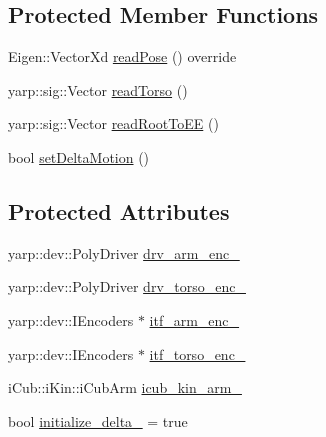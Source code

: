 \subsection*{Protected Member Functions}
\begin{DoxyCompactItemize}
\item 
Eigen\+::\+Vector\+Xd \hyperlink{classiCubFwdKinModel_ad549519048e9b54c18af51c6b173b726}{read\+Pose} () override
\item 
yarp\+::sig\+::\+Vector \hyperlink{classiCubFwdKinModel_a4ed6df084a996223a740a7065e16b799}{read\+Torso} ()
\item 
yarp\+::sig\+::\+Vector \hyperlink{classiCubFwdKinModel_a638ea7ef68d98f306346684c93934a93}{read\+Root\+To\+EE} ()
\item 
bool \hyperlink{classFwdKinModel_a12b54bd62ba5cf218973c600c66ba39e}{set\+Delta\+Motion} ()
\end{DoxyCompactItemize}
\subsection*{Protected Attributes}
\begin{DoxyCompactItemize}
\item 
yarp\+::dev\+::\+Poly\+Driver \hyperlink{classiCubFwdKinModel_a3a07f11e9b770e8fc7c03bff05c52927}{drv\+\_\+arm\+\_\+enc\+\_\+}
\item 
yarp\+::dev\+::\+Poly\+Driver \hyperlink{classiCubFwdKinModel_af0ca571291c508a2a058c1ff802e6421}{drv\+\_\+torso\+\_\+enc\+\_\+}
\item 
yarp\+::dev\+::\+I\+Encoders $\ast$ \hyperlink{classiCubFwdKinModel_a4478fa4b4f0689d819a19a5cccd69ae2}{itf\+\_\+arm\+\_\+enc\+\_\+}
\item 
yarp\+::dev\+::\+I\+Encoders $\ast$ \hyperlink{classiCubFwdKinModel_a2d83dd73bf08f66563e9e33d2c26d16a}{itf\+\_\+torso\+\_\+enc\+\_\+}
\item 
i\+Cub\+::i\+Kin\+::i\+Cub\+Arm \hyperlink{classiCubFwdKinModel_a4b92808d2c83eaff8a3bf18dede7001a}{icub\+\_\+kin\+\_\+arm\+\_\+}
\item 
bool \hyperlink{classFwdKinModel_a2ed7b77ebd710e5debe63b83a34a1645}{initialize\+\_\+delta\+\_\+} = true
\end{DoxyCompactItemize}
